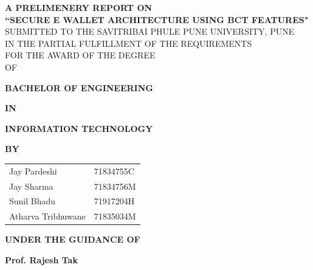 \documentclass[oneside,a4paper,12pt]{report}
\begin{document}
\setlength{\parindent}{0mm}
\begin{center}
{\bfseries \fontsize{16}{14} \selectfont  A PRELIMENERY REPORT ON  \\}
 \vspace*{1.5\baselineskip}
{\bfseries \fontsize{16}{14} \selectfont ``SECURE E WALLET ARCHITECTURE USING BCT FEATURES"\\ \vspace*{1.5\baselineskip}}
{\fontsize{12}{12} \selectfont SUBMITTED TO THE SAVITRIBAI PHULE PUNE UNIVERSITY, PUNE\\
IN THE PARTIAL FULFILLMENT OF THE REQUIREMENTS  \\
FOR THE AWARD OF THE DEGREE \\
OF\\	
\vspace*{1\baselineskip}}

{\bfseries \fontsize{14}{12} \selectfont BACHELOR OF ENGINEERING\\
\vspace*{0.6\baselineskip}}

{\bfseries \fontsize{14}{12} \selectfont IN\\
\vspace*{0.6\baselineskip}}

{\bfseries \fontsize{14}{12} \selectfont INFORMATION TECHNOLOGY\\
\vspace*{1\baselineskip}}

{\bfseries \fontsize{12}{12} \selectfont  BY \\
\vspace*{0.5\baselineskip}}

\begin{tabular}{l l}
Jay Pardeshi & 71834755C\\
Jay Sharma & 71834756M\\
Sunil Bhadu & 71917204H\\
Atharva Tribhuwane & 71835034M\\
\end{tabular}

\vspace*{0.7\baselineskip}

{\bfseries \fontsize{14}{12} \selectfont UNDER THE GUIDANCE OF \\
\vspace*{0.5\baselineskip}}

{\bfseries \fontsize{14}{12} \selectfont Prof. Rajesh Tak\\
\vspace*{0.5\baselineskip}}


\end{center}
\end{document}
